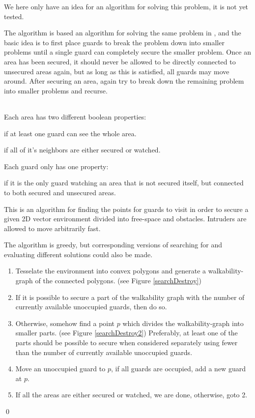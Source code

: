 We here only have an idea for an algorithm for solving this problem, it is not yet tested.

The algorithm is based an algorithm for solving the same problem in \cite{multiSearchSecure}, and the basic idea is to first place guards to break the problem down into smaller problems until a single guard can completely secure the smaller problem.
Once an area has been secured, it should never be allowed to be directly connected to unsecured areas again, but as long as this is satisfied, all guards may move around.
After securing an area, again try to break down the remaining problem into smaller problems and recurse.

\ \\
Each area has two different boolean properties:
\begin{definition}[Watched]
if at least one guard can see the whole area.
\end{definition}
\begin{definition}[Secured]
if all of it's neighbors are either secured or watched.
\end{definition}

Each guard only has one property:
\begin{definition}[Occupied]
if it is the only guard watching an area that is not secured itself, but connected to both secured and unsecured areas.
\end{definition}

\begin{algorithm}
This is an algorithm for finding the points for guards to visit in order to secure a given 2D vector environment divided into free-space and obstacles. Intruders are allowed to move arbitrarily fast.

The algorithm is greedy, but corresponding versions of searching for and evaluating different solutions could also be made.
\begin{enumerate}
	\item Tesselate the environment into convex polygons and generate a walkability-graph of the connected polygons. (see Figure \ref{searchDestroy})
	\item If it is possible to secure a part of the walkability graph with the number of currently available unoccupied guards, then do so.
	\item Otherwise, somehow find a point $p$ which divides the walkability-graph into smaller parts. (see Figure \ref{searchDestroy2})
			Preferably, at least one of the parts should be possible to secure when considered separately using fewer than the number of currently available unoccupied guards.
	\item Move an unoccupied guard to $p$, if all guards are occupied, add a new guard at $p$.
	\item If all the areas are either secured or watched, we are done, otherwise, goto 2.
\end{enumerate}
\qed
\label{algSearchDestroyIdea}
\end{algorithm}

